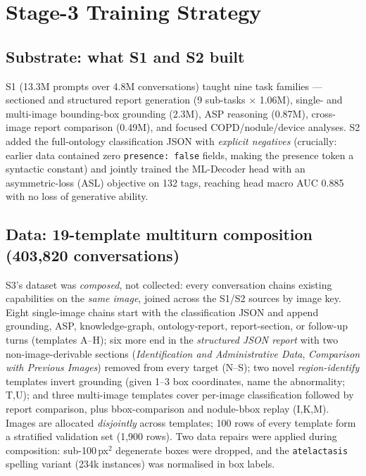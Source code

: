 \documentclass[10pt,a4paper]{article}
\begin{document}
\section{Stage-3 Training Strategy}

\subsection{Substrate: what S1 and S2 built}

S1 (13.3M prompts over 4.8M conversations) taught nine task families --- sectioned and
structured report generation (9 sub-tasks $\times$ 1.06M), single- and multi-image
bounding-box grounding (2.3M), ASP reasoning (0.87M), cross-image report comparison
(0.49M), and focused COPD/nodule/device analyses. S2 added the full-ontology
classification JSON with \emph{explicit negatives} (crucially: earlier data contained
zero \texttt{presence:\,false} fields, making the presence token a syntactic constant)
and jointly trained the ML-Decoder head with an asymmetric-loss (ASL) objective on 132
tags, reaching head macro AUC 0.885 with no loss of generative ability.

\subsection{Data: 19-template multiturn composition (403{,}820 conversations)}

S3's dataset was \emph{composed}, not collected: every conversation chains existing
capabilities on the \emph{same image}, joined across the S1/S2 sources by image key.
Eight single-image chains start with the classification JSON and append grounding,
ASP, knowledge-graph, ontology-report, report-section, or follow-up turns
(templates A--H); six more end in the \emph{structured JSON report} with two
non-image-derivable sections (\emph{Identification and Administrative Data},
\emph{Comparison with Previous Images}) removed from every target (N--S); two novel
\emph{region-identify} templates invert grounding (given 1--3 box coordinates, name the
abnormality; T,U); and three multi-image templates cover per-image classification
followed by report comparison, plus bbox-comparison and nodule-bbox replay (I,K,M).
Images are allocated \emph{disjointly} across templates; 100 rows of every template form
a stratified validation set (1{,}900 rows). Two data repairs were applied during
composition: sub-100\,px$^2$ degenerate boxes were dropped, and the
\texttt{atelactasis} spelling variant (234k instances) was normalised in box labels.
\end{document}
